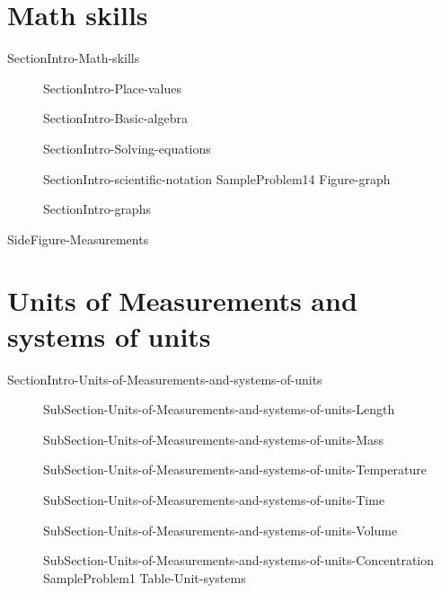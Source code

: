 \documentclass[main.tex]{subfiles}
\newcommand\chapterlabel{Ch-measurements}\setcounter{figurenewcounter}{0}\setcounter{tablenewcounter}{0}\setcounter{formulanewcounter}{0}\chapterpicture{../{\chapterlabel}/figure1}\chapterpicturelabel{PngImg}
\begin{document}
\section{Math skills}{SectionIntro-Math-skills}
\sloppy\begin{description}
\item[]{SectionIntro-Place-values}
\item[]{SectionIntro-Basic-algebra}
\item[]{SectionIntro-Solving-equations}
\item[]{SectionIntro-scientific-notation}
{SampleProblem14}%
{Figure-graph}
\item[]{SectionIntro-graphs}
\end{description}



{SideFigure-Measurements}\section{Units of Measurements and systems of units}
{SectionIntro-Units-of-Measurements-and-systems-of-units}
\sloppy\begin{description}
\item[]{SubSection-Units-of-Measurements-and-systems-of-units-Length}
\item[]{SubSection-Units-of-Measurements-and-systems-of-units-Mass}
\item[]{SubSection-Units-of-Measurements-and-systems-of-units-Temperature}
\item[]{SubSection-Units-of-Measurements-and-systems-of-units-Time}
\item[]{SubSection-Units-of-Measurements-and-systems-of-units-Volume}
\item[]{SubSection-Units-of-Measurements-and-systems-of-units-Concentration}
{SampleProblem1}%
{Table-Unit-systems}
\end{description}
\end{document}
